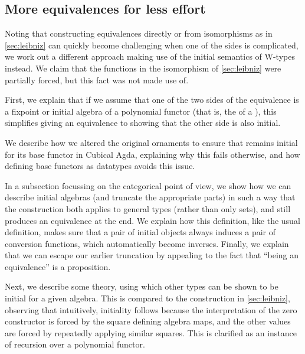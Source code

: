 \documentclass{article}
\theoremstyle{plain}%
\theoremstyle{definition}
\begin{document}
\subsection{More equivalences for less effort}\label{sec:userfriendly}
%

Noting that constructing equivalences directly or from isomorphisms as in \autoref{sec:leibniz} can quickly become challenging when one of the sides is complicated, we work out a different approach making use of the initial semantics of W-types instead. We claim that the functions in the isomorphism of \autoref{sec:leibniz} were partially forced, but this fact was not made use of.

First, we explain that if we assume that one of the two sides of the equivalence is a fixpoint or initial algebra of a polynomial functor (that is, the  of a ), this simplifies giving an equivalence to showing that the other side is also initial.

We describe how we altered the original ornaments \cite{progorn} to ensure that  remains initial for its base functor in Cubical Agda, explaining why this fails otherwise, and how defining base functors as datatypes avoids this issue.

In a subsection focussing on the categorical point of view, we show how we can describe initial algebras (and truncate the appropriate parts) in such a way that the construction both applies to general types (rather than only sets), and still produces an equivalence at the end. We explain how this definition, like the usual definition, makes sure that a pair of initial objects always induces a pair of conversion functions, which automatically become inverses. Finally, we explain that we can escape our earlier truncation by appealing to the fact that ``being an equivalence'' is a proposition.

Next, we describe some theory, using which other types can be shown to be initial for a given algebra. This is compared to the construction in \autoref{sec:leibniz}, observing that intuitively, initiality follows because the interpretation of the zero constructor is forced by the square defining algebra maps, and the other values are forced by repeatedly applying similar squares. This is clarified as an instance of recursion over a polynomial functor.
\end{document}

